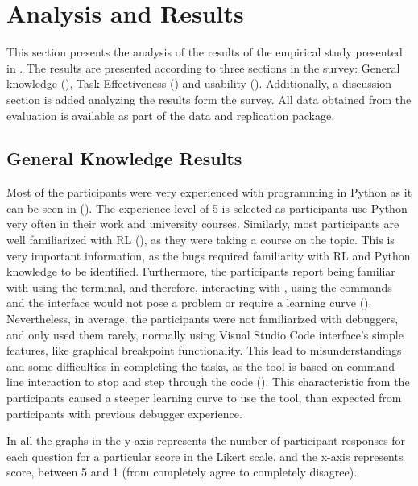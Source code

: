 
\section{Analysis and Results}
\label{sec:results}

This section presents the analysis of the results of the empirical study presented in 
. The results are presented according to three sections in the survey: General 
knowledge (), Task Effectiveness () and usability 
(). Additionally, a discussion section is added analyzing the results form the survey. 
All data obtained from the evaluation is available as part of the data and replication 
package.


\subsection{General Knowledge Results}
\label{sec:general-knowledge}

Most of the participants were very experienced with programming in Python as it can be seen in 
(). The experience level of 5 is selected as participants use Python very 
often in their work and university courses. 
Similarly, most participants are well familiarized with \ac{RL} (), as they were 
taking a course on the topic. This is very important information, as the bugs required familiarity with 
\ac{RL} and Python knowledge to be identified. Furthermore, the participants report being familiar 
with using the terminal, and therefore, interacting with \flik, using the commands and the interface 
would not pose a problem or require a learning curve (). 
Nevertheless, in average, the participants were not familiarized with debuggers, and only used them  
rarely, normally using Visual Studio Code interface's simple features, like graphical breakpoint 
functionality. This lead to misunderstandings and some difficulties in completing the tasks, as the 
tool is based on command line interaction to stop and step through the code 
(). This characteristic from the participants caused a steeper learning 
curve to use the tool, than expected from participants with previous debugger experience.

In all the graphs in  the y-axis represents the number of participant  
responses for each question for a particular score in the Likert scale, and the x-axis represents score, 
between 5 and 1 (from completely agree to completely disagree).

